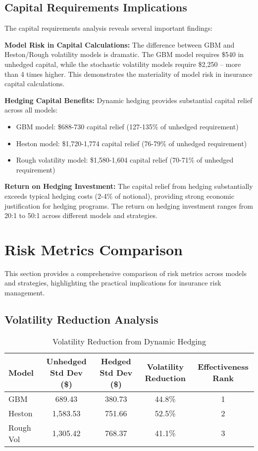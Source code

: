 \documentclass[12pt,a4paper]{report}
\begin{document}
\subsection{Capital Requirements Implications}

The capital requirements analysis reveals several important findings:

\textbf{Model Risk in Capital Calculations:}
The difference between GBM and Heston/Rough volatility models is dramatic. The GBM model requires \$540 in unhedged capital, while the stochastic volatility models require \$2,250 – more than 4 times higher. This demonstrates the materiality of model risk in insurance capital calculations.

\textbf{Hedging Capital Benefits:}
Dynamic hedging provides substantial capital relief across all models:
\begin{itemize}
\item GBM model: \$688-730 capital relief (127-135\% of unhedged requirement)
\item Heston model: \$1,720-1,774 capital relief (76-79\% of unhedged requirement)  
\item Rough volatility model: \$1,580-1,604 capital relief (70-71\% of unhedged requirement)
\end{itemize}

\textbf{Return on Hedging Investment:}
The capital relief from hedging substantially exceeds typical hedging costs (2-4\% of notional), providing strong economic justification for hedging programs. The return on hedging investment ranges from 20:1 to 50:1 across different models and strategies.

\section{Risk Metrics Comparison}

This section provides a comprehensive comparison of risk metrics across models and strategies, highlighting the practical implications for insurance risk management.

\subsection{Volatility Reduction Analysis}

\begin{table}[H]
\centering
\caption{Volatility Reduction from Dynamic Hedging}
\label{tab:vol_reduction}
\begin{tabular}{lcccc}
\toprule
\textbf{Model} & \textbf{Unhedged Std Dev (\$)} & \textbf{Hedged Std Dev (\$)} & \textbf{Volatility Reduction} & \textbf{Effectiveness Rank} \\
\midrule
GBM & 689.43 & 380.73 & 44.8\% & 1 \\
Heston & 1,583.53 & 751.66 & 52.5\% & 2 \\
Rough Vol & 1,305.42 & 768.37 & 41.1\% & 3 \\
\bottomrule
\end{tabular}
\end{table}
\end{document}

